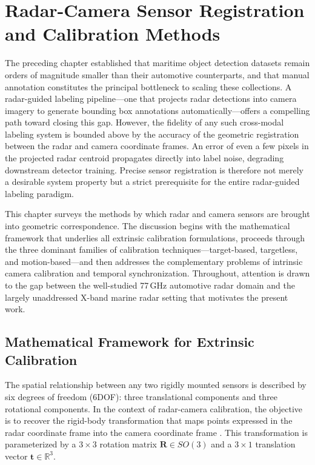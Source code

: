 \section{Radar-Camera Sensor Registration and Calibration Methods}\label{sec:calibration}

The preceding chapter established that maritime object detection datasets remain orders of magnitude smaller than their automotive counterparts, and that manual annotation constitutes the principal bottleneck to scaling these collections. A radar-guided labeling pipeline---one that projects radar detections into camera imagery to generate bounding box annotations automatically---offers a compelling path toward closing this gap. However, the fidelity of any such cross-modal labeling system is bounded above by the accuracy of the geometric registration between the radar and camera coordinate frames. An error of even a few pixels in the projected radar centroid propagates directly into label noise, degrading downstream detector training. Precise sensor registration is therefore not merely a desirable system property but a strict prerequisite for the entire radar-guided labeling paradigm.

This chapter surveys the methods by which radar and camera sensors are brought into geometric correspondence. The discussion begins with the mathematical framework that underlies all extrinsic calibration formulations, proceeds through the three dominant families of calibration techniques---target-based, targetless, and motion-based---and then addresses the complementary problems of intrinsic camera calibration and temporal synchronization. Throughout, attention is drawn to the gap between the well-studied 77\,GHz automotive radar domain and the largely unaddressed X-band marine radar setting that motivates the present work.

\subsection{Mathematical Framework for Extrinsic Calibration}\label{sec:math_framework}

The spatial relationship between any two rigidly mounted sensors is described by six degrees of freedom (6DOF): three translational components and three rotational components. In the context of radar-camera calibration, the objective is to recover the rigid-body transformation that maps points expressed in the radar coordinate frame into the camera coordinate frame \cite{persic2019extrinsic}. This transformation is parameterized by a $3\times3$ rotation matrix $\mathbf{R} \in SO(3)$ and a $3\times1$ translation vector $\mathbf{t} \in \mathbb{R}^{3}$.

